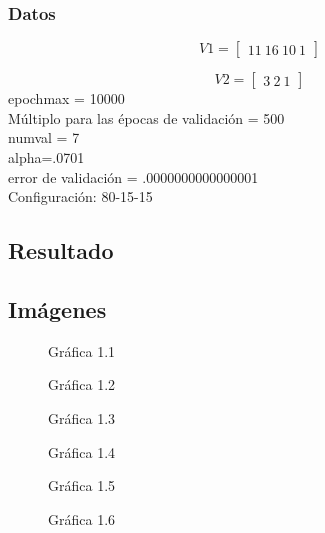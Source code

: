 \documentclass[6pt]{article}
\begin{document}
\subsubsection{Datos}
\[V1=
\begin{bmatrix}
11\ 16\ 10\ 1
\end{bmatrix}\]

\[V2=
\begin{bmatrix}
3\ 2\ 1
\end{bmatrix}\]
epochmax = 10000\\
Múltiplo para las épocas de validación = 500\\
numval = 7\\
alpha=.0701\\
error de validación = .0000000000000001\\
Configuración: 80-15-15
\subsection{Resultado}
\subsection{Imágenes}
\begin{figure}[htpb]
	\centering
	
	\caption{Gráfica 1.1}
\end{figure}

\begin{figure}[htpb]
	\centering
	
	\caption{Gráfica 1.2}
\end{figure}

\begin{figure}[htpb]
	\centering
	
	\caption{Gráfica 1.3}
\end{figure}

\begin{figure}[htpb]
	\centering
	
	\caption{Gráfica 1.4}
\end{figure}

\begin{figure}[htpb]
	\centering
	
	\caption{Gráfica 1.5}
\end{figure}

\begin{figure}[htpb]
	\centering
	
	\caption{Gráfica 1.6}
\end{figure}
\end{document}
